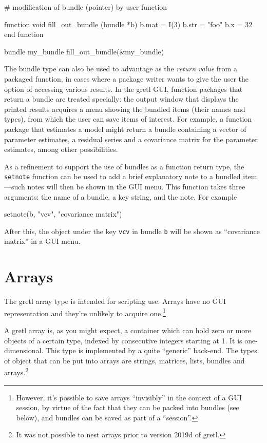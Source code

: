 \begin{code}
# modification of bundle (pointer) by user function

function void fill_out_bundle (bundle *b)
  b.mat =  I(3)
  b.str = "foo"
  b.x = 32
end function

bundle my_bundle 
fill_out_bundle(&my_bundle)
\end{code}

The bundle type can also be used to advantage as the \textit{return
  value} from a packaged function, in cases where a package writer
wants to give the user the option of accessing various results. In the
gretl GUI, function packages that return a bundle are treated
specially: the output window that displays the printed results
acquires a menu showing the bundled items (their names and types),
from which the user can save items of interest. For example, a
function package that estimates a model might return a bundle 
containing a vector of parameter estimates, a residual series and a
covariance matrix for the parameter estimates, among other
possibilities.

As a refinement to support the use of bundles as a function return
type, the \texttt{setnote} function can be used to add a brief
explanatory note to a bundled item---such notes will then be shown in
the GUI menu.  This function takes three arguments: the name of a
bundle, a key string, and the note. For example

\begin{code}
setnote(b, "vcv", "covariance matrix")
\end{code}

After this, the object under the key \texttt{vcv} in bundle \texttt{b}
will be shown as ``covariance matrix'' in a GUI menu.

\section{Arrays}
\label{sec:arrays}

The gretl array type is intended for scripting use. Arrays have no GUI
representation and they're unlikely to acquire one.\footnote{However,
  it's possible to save arrays ``invisibly'' in the context of a GUI
  session, by virtue of the fact that they can be packed into bundles
  (see below), and bundles can be saved as part of a ``session''.}

A gretl array is, as you might expect, a container which can hold zero
or more objects of a certain type, indexed by consecutive integers
starting at 1. It is one-dimensional. This type is implemented by a
quite ``generic'' back-end. The types of object that can be put into
arrays are strings, matrices, lists, bundles and arrays.\footnote{It
  was not possible to nest arrays prior to version 2019d of gretl.}

